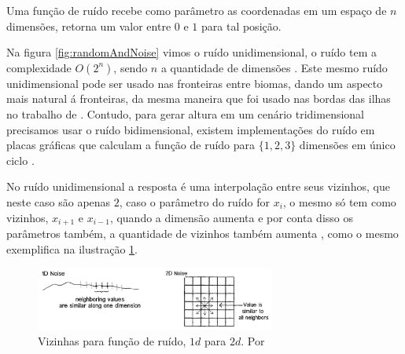 Uma função de ruído recebe como parâmetro as coordenadas em um espaço de $n$ dimensões,
retorna um valor entre $0$ e $1$ para tal posição\cite{shiffman2012nature}.

Na figura \ref{fig:randomAndNoise} vimos o ruído unidimensional, o ruído
tem a complexidade $O(2^n)$, sendo $n$ a quantidade de dimensões \cite{zucker2001perlin}.
Este mesmo ruído unidimensional pode ser usado nas fronteiras entre biomas, dando
um aspecto mais natural á fronteiras, da mesma maneira que foi usado nas bordas
das ilhas no trabalho de \cite{patel2010polygonal}. Contudo, para gerar altura
em um cenário tridimensional precisamos usar o ruído bidimensional, existem
implementações do ruído em placas gráficas que calculam a função de ruído para 
$\{1, 2, 3\}$ dimensões em único ciclo \cite{perlin2002improving}.

No ruído unidimensional a resposta é uma interpolação entre seus vizinhos, que
neste caso são apenas $2$, caso o parâmetro do ruído for $x_{i}$, o mesmo só tem 
como vizinhos, $x_{i+1}$ e $x_{i-1}$, quando a dimensão aumenta e por conta disso
os parâmetros também, a quantidade de vizinhos também aumenta \cite{shiffman2012nature}, 
como o mesmo exemplifica na ilustração \ref{fig:1dto2dnoise}.
\begin{figure}[H]
    \centering
    \includegraphics[width=0.7\textwidth]{figuras/1dto2dnoise.png}
    \caption{Vizinhas para função de ruído, $1d$ para $2d$. Por \cite{shiffman2012nature}}
    \label{fig:1dto2dnoise}
\end{figure}

